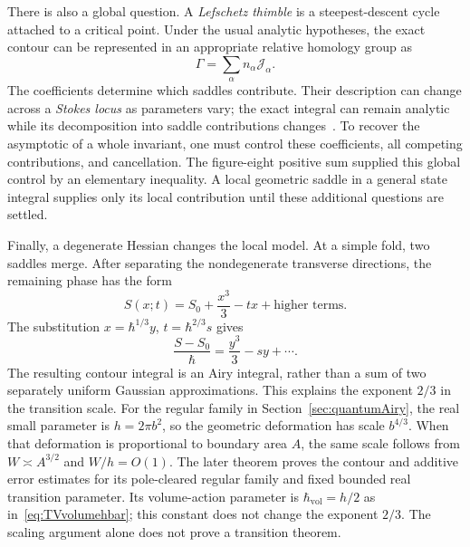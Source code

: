 There is also a global question. A \emph{Lefschetz thimble} is a
steepest-descent cycle attached to a critical point. Under the
usual analytic hypotheses, the exact contour can be represented
in an appropriate relative homology group as
\[
 \Gamma=\sum_\alpha n_\alpha\mathcal J_\alpha.
\]
The coefficients determine which saddles contribute. Their
description can change across a \emph{Stokes locus} as parameters
vary; the exact integral can remain analytic while its decomposition
into saddle contributions changes~\cite[Sections 2--3]{WittenContinuation}.
To recover the asymptotic of a whole invariant, one must control
these coefficients, all competing contributions, and cancellation.
The figure-eight positive sum supplied this global control by an
elementary inequality. A local geometric saddle in a general
state integral supplies only its local contribution until these
additional questions are settled.

Finally, a degenerate Hessian changes the local model. At a simple
fold, two saddles merge. After separating the nondegenerate
transverse directions, the remaining phase has the form
\[
 S(x;t)=S_0+\frac{x^3}{3}-tx+\text{higher terms}.
\]
The substitution $x=\hbar^{1/3}y$, $t=\hbar^{2/3}s$ gives
\[
 \frac{S-S_0}{\hbar}=\frac{y^3}{3}-sy+\cdots.
\]
The resulting contour integral is an Airy integral, rather than
a sum of two separately uniform Gaussian approximations. This
explains the exponent $2/3$ in the transition scale. For the regular
family in Section~\ref{sec:quantumAiry}, the real small parameter
is $h=2\pi b^2$, so the geometric deformation has scale
$b^{4/3}$. When that deformation is proportional to boundary area
$A$, the same scale follows from $W\asymp A^{3/2}$ and $W/h=O(1)$.
The later theorem proves the contour and additive error estimates
for its pole-cleared regular family and fixed bounded real
transition parameter. Its volume-action parameter is
$\hbar_{\mathrm{vol}}=h/2$ as in~\eqref{eq:TVvolumehbar}; this
constant does not change the exponent $2/3$. The scaling argument
alone does not prove a transition theorem.


